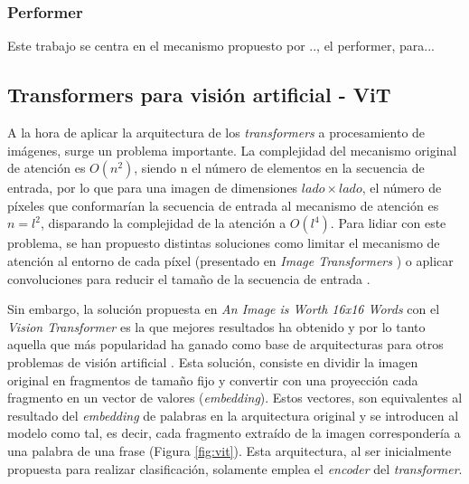 

\subsubsection{Performer}
Este trabajo se centra en el mecanismo propuesto por .., el performer, para...

\subsection{Transformers para visión artificial - ViT}
A la hora de aplicar la arquitectura de los \textit{transformers} a procesamiento de imágenes, surge un problema importante. La complejidad del mecanismo original de atención es $O(n^{2})$, siendo n el número de elementos en la secuencia de entrada, por lo que para una imagen de dimensiones $lado \times lado$, el número de píxeles que conformarían la secuencia de entrada al mecanismo de atención es $n = l^2$, disparando la complejidad de la atención a $O(l^{4})$. Para lidiar con este problema, se han propuesto distintas soluciones como limitar el mecanismo de atención al entorno de cada píxel (presentado en \textit{Image Transformers} \cite{image_transformer}) o aplicar convoluciones para reducir el tamaño de la secuencia de entrada \cite{detrfacebookdetectiontransformers}. 

Sin embargo, la solución propuesta en \textit{An Image is Worth 16x16 Words} con el \textit{Vision Transformer} \cite{image16x16words} es la que mejores resultados ha obtenido y por lo tanto aquella que más popularidad ha ganado como base de arquitecturas para otros problemas de visión artificial \cite{visiontransformersDPT, bhat2020adabins, chen2021transunet, liu2021Swin}. Esta solución, consiste en dividir la imagen original en fragmentos de tamaño fijo y convertir con una proyección cada fragmento en un vector de valores (\textit{embedding}). Estos vectores, son equivalentes al resultado del \textit{embedding} de palabras en la arquitectura original y se introducen al modelo como tal, es decir, cada fragmento extraído de la imagen correspondería a una palabra de una frase (Figura \ref{fig:vit}). Esta arquitectura, al ser inicialmente propuesta para realizar clasificación, solamente emplea el \textit{encoder} del \textit{transformer}.

